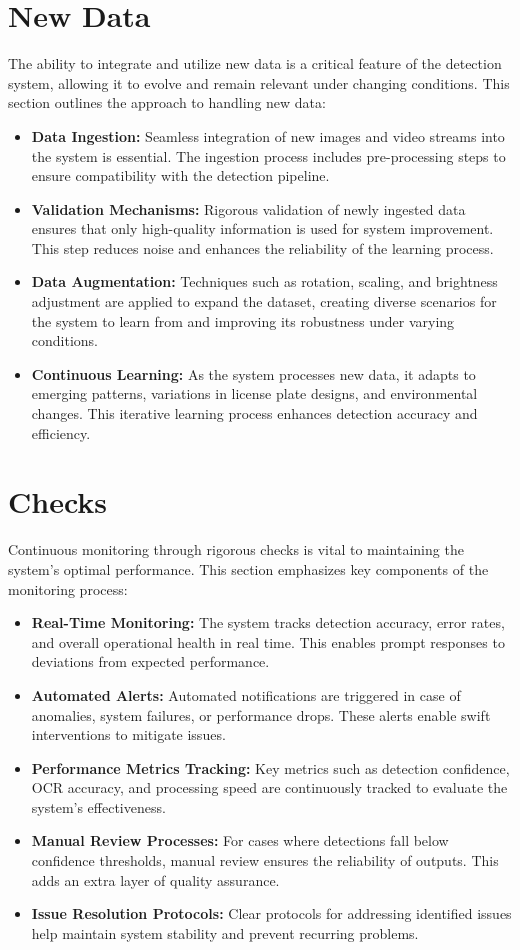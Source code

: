 \section{New Data}

The ability to integrate and utilize new data is a critical feature of the detection system, allowing it to evolve and remain relevant under changing conditions. This section outlines the approach to handling new data:
\begin{itemize}
	\item \textbf{Data Ingestion:} Seamless integration of new images and video streams into the system is essential. The ingestion process includes pre-processing steps to ensure compatibility with the detection pipeline.
	\item \textbf{Validation Mechanisms:} Rigorous validation of newly ingested data ensures that only high-quality information is used for system improvement. This step reduces noise and enhances the reliability of the learning process.
	\item \textbf{Data Augmentation:} Techniques such as rotation, scaling, and brightness adjustment are applied to expand the dataset, creating diverse scenarios for the system to learn from and improving its robustness under varying conditions.
	\item \textbf{Continuous Learning:} As the system processes new data, it adapts to emerging patterns, variations in license plate designs, and environmental changes. This iterative learning process enhances detection accuracy and efficiency.
\end{itemize}

\section{Checks}

Continuous monitoring through rigorous checks is vital to maintaining the system’s optimal performance. This section emphasizes key components of the monitoring process:
\begin{itemize}
	\item \textbf{Real-Time Monitoring:} The system tracks detection accuracy, error rates, and overall operational health in real time. This enables prompt responses to deviations from expected performance.
	\item \textbf{Automated Alerts:} Automated notifications are triggered in case of anomalies, system failures, or performance drops. These alerts enable swift interventions to mitigate issues.
	\item \textbf{Performance Metrics Tracking:} Key metrics such as detection confidence, OCR accuracy, and processing speed are continuously tracked to evaluate the system's effectiveness.
	\item \textbf{Manual Review Processes:} For cases where detections fall below confidence thresholds, manual review ensures the reliability of outputs. This adds an extra layer of quality assurance.
	\item \textbf{Issue Resolution Protocols:} Clear protocols for addressing identified issues help maintain system stability and prevent recurring problems.
\end{itemize}

